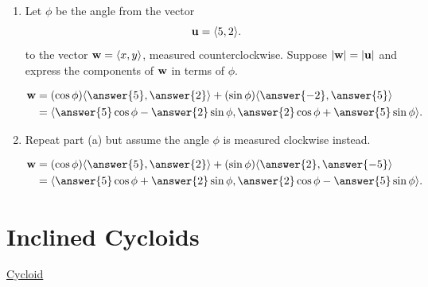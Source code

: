 \documentclass{ximera}
\begin{document}
\begin{question} \label{Q4nvnef3ef}
\begin{enumerate} 
\item Let $\phi$ be the angle from the vector  
\[
     {\bf u} = \langle 5, 2 \rangle.
\]
to the vector ${\bf w}= \langle x, y\rangle$, measured counterclockwise. Suppose $|{\bf w}| = |{\bf u}|$ and express the components of ${\bf w}$ in terms of $\phi$.

\begin{align*}
      {\bf w} &= (\cos\phi) \langle \answer{5} , \answer{2} \rangle  + (\sin\phi) \langle \answer{-2} , \answer{5}  \rangle \\
                 &= \langle \answer{5}\cos\phi - \answer{2}\sin\phi , \answer{2}\cos\phi + \answer{5}\sin \phi  \rangle .  
\end{align*}

\item Repeat part (a) but assume the angle $\phi$ is measured clockwise instead.

\begin{align*}
      {\bf w} &= (\cos\phi) \langle \answer{5} , \answer{2} \rangle  + (\sin\phi) \langle \answer{2} , \answer{-5}  \rangle \\
                 &= \langle \answer{5}\cos\phi + \answer{2}\sin\phi , \answer{2}\cos\phi - \answer{5}\sin \phi  \rangle .  
\end{align*}
\end{enumerate}
\end{question}

\section{Inclined Cycloids}

\href{https://www.geogebra.org/classic/gchvgn68}{Cycloid}

 
\begin{onlineOnly}
    \begin{center}
\end{center}
\end{onlineOnly}
\end{document}
